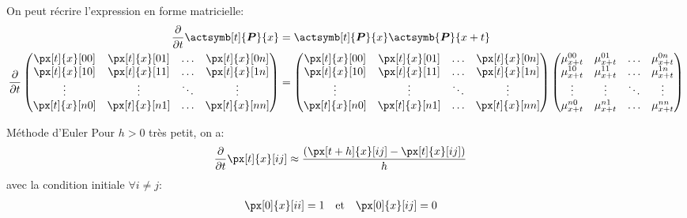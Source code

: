 \documentclass[10pt, french]{article}
\begin{document}
\begin{multicols*}{2}
On peut récrire l'expression en forme matricielle:
	\setlength{\mathindent}{-1cm}
\begin{align*}
	\derivee{t}{} \actsymb[t]{\bm{P}}{x}
	&=	\actsymb[t]{\bm{P}}{x} \actsymb{\bm{P}}{x + t}	\\
	\derivee{t}{}
	\begin{pmatrix}
	\px[t]{x}[00]	&	\px[t]{x}[01]	&	\dots	&	\px[t]{x}[0n]	\\
	\px[t]{x}[10]	&	\px[t]{x}[11]	&	\dots	&	\px[t]{x}[1n]	\\
	\vdots			&	\vdots			&	\ddots	&	\vdots	\\
	\px[t]{x}[n0]	&	\px[t]{x}[n1]	&	\dots	&	\px[t]{x}[nn]	
	\end{pmatrix}
	&=	
	\begin{pmatrix}
	\px[t]{x}[00]	&	\px[t]{x}[01]	&	\dots	&	\px[t]{x}[0n]	\\
	\px[t]{x}[10]	&	\px[t]{x}[11]	&	\dots	&	\px[t]{x}[1n]	\\
	\vdots			&	\vdots			&	\ddots	&	\vdots	\\
	\px[t]{x}[n0]	&	\px[t]{x}[n1]	&	\dots	&	\px[t]{x}[nn]	
	\end{pmatrix}
	\begin{pmatrix}
	\mu_{x + t}^{00}	&	\mu_{x + t}^{01}	&	\dots	&	\mu_{x + t}^{0n}	\\
	\mu_{x + t}^{10}	&	\mu_{x + t}^{11}	&	\dots	&	\mu_{x + t}^{1n}	\\
	\vdots			&	\vdots			&	\ddots	&	\vdots	\\
	\mu_{x + t}^{n0}	&	\mu_{x + t}^{n1}	&	\dots	&	\mu_{x + t}^{nn}	
	\end{pmatrix}
\end{align*}
	\setlength{\mathindent}{1cm}
	
\begin{conceptgen}{Méthode d'Euler}
Pour $h > 0$ très petit, on a: 
\begin{align*}
	\derivee{t}{} \px[t]{x}[ij]
	&\approx	\frac{(\px[t + h]{x}[ij] - \px[t]{x}[ij])}{h}
\end{align*}
avec la condition initiale $\forall i \neq j$:
\begin{align*}
	\px[0]{x}[ii]	&=	1	&	&\text{et}	&	\px[0]{x}[ij]	&=	0
\end{align*}
\end{conceptgen}


\end{multicols*}
\end{document}

